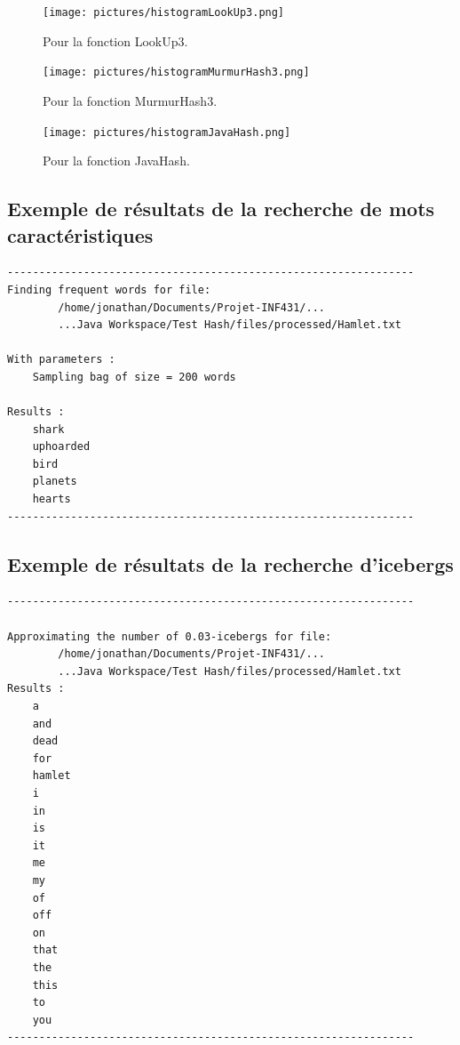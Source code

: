 \documentclass[12pt,a4paper,titlepage]{article}
\begin{document}
\begin{figure}[!h]
	\centering
	\texttt{[image: pictures/histogramLookUp3.png]}
	\caption{Pour la fonction LookUp3.}
\end{figure}

\begin{figure}[!h]
	\centering
	\texttt{[image: pictures/histogramMurmurHash3.png]}
	\caption{Pour la fonction MurmurHash3.}
\end{figure}

\begin{figure}[!h]
	\centering
	\texttt{[image: pictures/histogramJavaHash.png]}
	\caption{Pour la fonction JavaHash.}
\end{figure}


\subsection*{Exemple de résultats de la recherche de mots caractéristiques}
\label{exemple:significantWords}

\begin{verbatim}
----------------------------------------------------------------
Finding frequent words for file:
        /home/jonathan/Documents/Projet-INF431/...
        ...Java Workspace/Test Hash/files/processed/Hamlet.txt

With parameters :
    Sampling bag of size = 200 words

Results :
    shark
    uphoarded
    bird
    planets
    hearts
----------------------------------------------------------------
\end{verbatim}
 
\subsection*{Exemple de résultats de la recherche d'icebergs}
\label{exemple:icebergs}

\begin{verbatim}
----------------------------------------------------------------

Approximating the number of 0.03-icebergs for file:
        /home/jonathan/Documents/Projet-INF431/...
        ...Java Workspace/Test Hash/files/processed/Hamlet.txt
Results :
    a
    and
    dead
    for
    hamlet
    i
    in
    is
    it
    me
    my
    of
    off
    on
    that
    the
    this
    to
    you
----------------------------------------------------------------
\end{verbatim}
\end{document}
